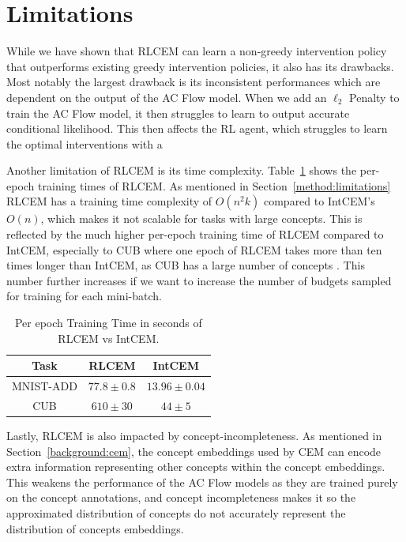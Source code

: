 \section{Limitations}\label{eval:limitations}
While we have shown that RLCEM can learn a non-greedy intervention 
policy that outperforms existing greedy intervention
policies, it also has its drawbacks. Most notably the largest
drawback is its inconsistent performances which are dependent
on the output of the AC Flow model. When we add an $\ell_2$ Penalty
to train the AC Flow model, it then struggles to learn to 
output accurate conditional likelihood. This then affects the RL 
agent, which struggles to learn the optimal interventions with a 


Another limitation of RLCEM is its time complexity.
Table~\ref{table:training-times} shows the per-epoch
training times of RLCEM. As mentioned in Section~\ref{method:limitations}
RLCEM has a training time complexity of $O(n^2k)$ compared
to IntCEM's $O(n)$, which makes it not scalable for tasks
with large concepts. This is reflected by the much higher
per-epoch training time of RLCEM compared to IntCEM, especially
to CUB where one epoch of RLCEM takes more than ten times longer
than IntCEM, as CUB has a large number of concepts
. This number further increases if we want to increase 
the number of budgets sampled for training for each mini-batch.

\begin{table}[!ht]
    \renewcommand{\arraystretch}{1.5}
    \centering
    \begin{tabular}{c|cc}
        Task & RLCEM & IntCEM \\
        \hline
        MNIST-ADD & $77.8 \pm 0.8$ & $13.96 \pm 0.04$ \\
        CUB & $610 \pm 30$ & $44 \pm 5$ 
        
    \end{tabular}
    \caption{Per epoch Training Time in seconds of RLCEM vs IntCEM.}
    \label{table:training-times}
\end{table}

Lastly, RLCEM is also impacted by concept-incompleteness. As mentioned in Section~\ref{background:cem},
the concept embeddings used by CEM can encode
extra information representing other concepts within the concept embeddings.
This weakens the performance of the AC Flow models as they are trained purely on the concept annotations, and concept incompleteness makes it so the approximated distribution of concepts 
do not accurately represent the distribution of concepts embeddings.

